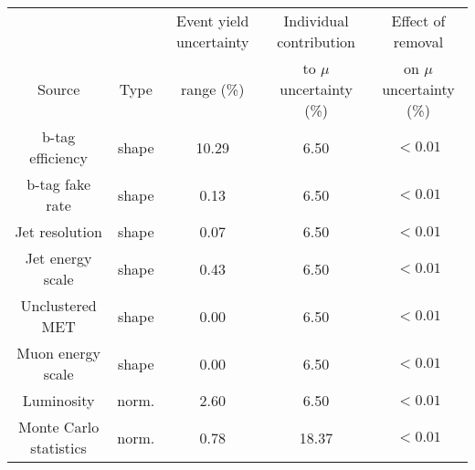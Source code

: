 \documentclass[]{report}
\begin{document}
\begin{landscape}
\begin{Large}
\begin{center}
\begin{tabular}{ccccc} \hline \hline
&  & Event yield uncertainty &Individual contribution & Effect of removal  \\
Source & Type & range (\%) &  to $\mu$ uncertainty (\%) & on $\mu$ uncertainty (\%) \\ \hline 
b-tag efficiency & shape & 10.29 & 6.50 & $<0.01$\\
b-tag fake rate & shape & 0.13 & 6.50 & $<0.01$\\
Jet resolution & shape & 0.07 & 6.50 & $<0.01$\\
Jet energy scale & shape & 0.43 & 6.50 & $<0.01$\\
Unclustered MET & shape & 0.00 & 6.50 & $<0.01$\\
Muon energy scale & shape & 0.00 & 6.50 & $<0.01$\\
Luminosity & norm. & 2.60 & 6.50 & $<0.01$\\
Monte Carlo statistics & norm. & 0.78 & 18.37 & $<0.01$\\
\hline 
\end{tabular}
\end{center}
\end{Large}
\end{landscape}
\end{document}
